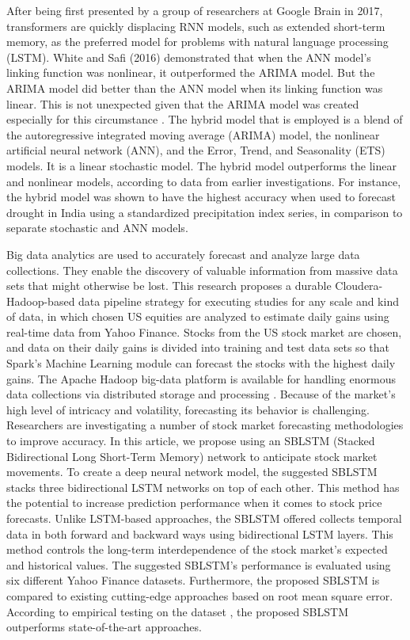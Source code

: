After being first presented by a group of researchers at Google Brain in 2017, transformers are 
quickly displacing RNN models, such as extended short-term memory, as the preferred model for 
problems with natural language processing (LSTM). White and Safi (2016) demonstrated that when 
the ANN model's linking function was nonlinear, it outperformed the ARIMA model. But the ARIMA 
model did better than the ANN model when its linking function was linear. This is not 
unexpected given that the ARIMA model was created especially for this circumstance 
\citep{safi2021hybrid}. The hybrid model that is employed is a blend of the autoregressive 
integrated moving average (ARIMA) model, the nonlinear artificial neural network (ANN), and the 
Error, Trend, and Seasonality (ETS) models. It is a linear stochastic model. The hybrid model 
outperforms the linear and nonlinear models, according to data from earlier investigations. For 
instance, the hybrid model was shown to have the highest accuracy when used to forecast drought 
in India using a standardized precipitation index series, in comparison to separate stochastic 
and ANN models.

Big data analytics are used to accurately forecast and analyze large data collections. They enable the discovery of valuable information from massive data sets that might otherwise be lost. This research proposes a durable Cloudera-Hadoop-based data pipeline strategy for executing studies for any scale and kind of data, in which chosen US equities are analyzed to estimate daily gains using real-time data from Yahoo Finance. Stocks from the US stock market are chosen, and data on their daily gains is divided into training and test data sets so that Spark's Machine Learning module can forecast the stocks with the highest daily gains. The Apache Hadoop big-data platform is available for handling enormous data collections via distributed storage and processing \citep{peng2019stocks}.
Because of the market's high level of intricacy and volatility, forecasting its behavior is challenging. Researchers are investigating a number of stock market forecasting methodologies to improve accuracy. In this article, we propose using an SBLSTM (Stacked Bidirectional Long Short-Term Memory) network to anticipate stock market movements. To create a deep neural network model, the suggested SBLSTM stacks three bidirectional LSTM networks on top of each other. This method has the potential to increase prediction performance when it comes to stock price forecasts. Unlike LSTM-based approaches, the SBLSTM offered collects temporal data in both forward and backward ways using bidirectional LSTM layers. This method controls the long-term interdependence of the stock market's expected and historical values. The suggested SBLSTM's performance is evaluated using six different Yahoo Finance datasets. Furthermore, the proposed SBLSTM is compared to existing cutting-edge approaches based on root mean square error. According to empirical testing on the dataset \citep{lim2021stacked}, the proposed SBLSTM outperforms state-of-the-art approaches.

